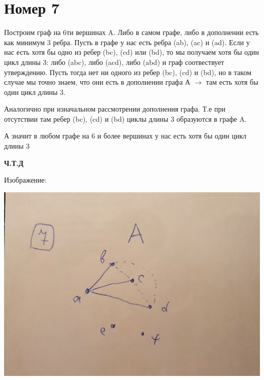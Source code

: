 \documentclass[a4paper,12pt]{article}
\begin{document}
\section*{Номер 7}
Построим граф на 6ти вершинах A. Либо в самом графе, либо в дополнении есть как минимум 3 ребра.  Пусть в графе у нас есть ребра (ab), (ac) и (ad). Если у нас есть хотя бы одно из ребер (bc), (cd) или (bd), то мы получаем хотя бы один цикл длины 3: либо (abc), либо (acd), либо (abd) и граф соотвествует утверждению. Пусть тогда нет ни одного из ребер (bc), (cd) и (bd), но в таком случае мы точно знаем, что они есть в дополнении графа  А  $\rightarrow$ там есть хотя бы один цикл длины 3.

Аналогично при изначальном рассмотрении дополнения графа. Т.е при отсутствии там ребер (bc), (cd) и (bd) циклы длины 3 образуются в графе A.

А значит в любом графе на 6 и более вершинах у нас есть хотя бы один цикл длины 3 
\begin{center}
\textbf{Ч.Т.Д}
\end{center}
\begin{center}
Изображение:
\end{center}
\begin{center}
\includegraphics[scale=0.2]{8.jpg}
\end{center}
\end{document}
